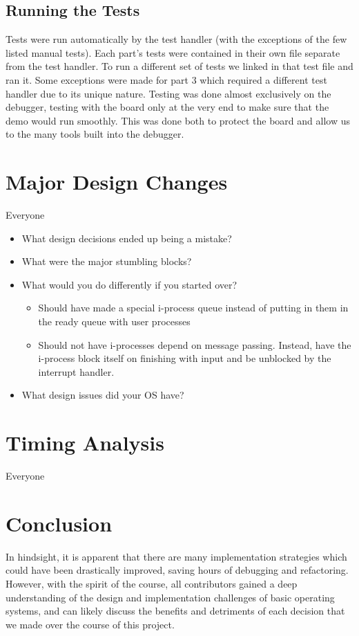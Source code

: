 \documentclass[11pt, oneside]{article}
\begin{document}
\subsection{Running the Tests} Tests were run automatically by the test handler (with the exceptions of the few listed manual tests). Each part's tests were contained in their own file separate from the test handler. To run a different set of tests we linked in that test file and ran it. Some exceptions were made for part 3 which required a different test handler due to its unique nature. Testing was done almost exclusively on the debugger, testing with the board only at the very end to make sure that the demo would run smoothly. This was done both to protect the board and allow us to the many tools built into the debugger.


\section{Major Design Changes}
Everyone
\begin{itemize}
\item What design decisions ended up being a mistake?
\item What were the major stumbling blocks?
\item What would you do differently if you started over?
\begin{itemize}
\item
Should have made a special i-process queue instead of putting in them in the ready queue with user processes
\item
Should not have i-processes depend on message passing. Instead, have the i-process block itself on finishing with input and be unblocked by the interrupt handler.
\end{itemize}
\item What design issues did your OS have?


\end{itemize}

\section{Timing Analysis}
Everyone

\section{Conclusion}
In hindsight, it is apparent that there are many implementation strategies which could have been drastically improved, saving hours of debugging and refactoring. However, with the spirit of the course, all contributors gained a deep understanding of the design and implementation challenges of basic operating systems, and can likely discuss the benefits and detriments of each decision that we made over the course of this project.
\end{document}

